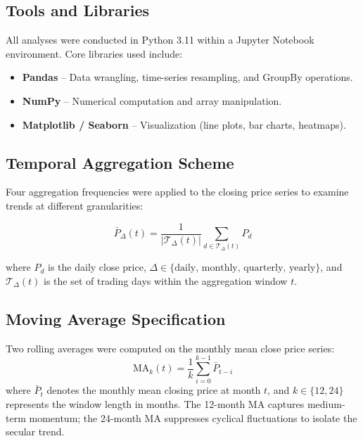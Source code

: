\documentclass[10pt,a4paper,twocolumn]{article}
\begin{document}
\subsection{Tools and Libraries}

All analyses were conducted in Python 3.11 within a Jupyter Notebook environment. Core libraries used include:
\begin{itemize}[leftmargin=1.2em, itemsep=1pt, topsep=2pt]
  \item \textbf{Pandas} -- Data wrangling, time-series resampling, and GroupBy operations.
  \item \textbf{NumPy} -- Numerical computation and array manipulation.
  \item \textbf{Matplotlib / Seaborn} -- Visualization (line plots, bar charts, heatmaps).
\end{itemize}

\subsection{Temporal Aggregation Scheme}

Four aggregation frequencies were applied to the closing price series to examine trends at different granularities:

\begin{equation}
  \bar{P}_{\Delta}(t) = \frac{1}{|\mathcal{T}_{\Delta}(t)|} \sum_{d \in \mathcal{T}_{\Delta}(t)} P_d
\end{equation}

where $P_d$ is the daily close price, $\Delta \in \{\text{daily, monthly, quarterly, yearly}\}$, and $\mathcal{T}_{\Delta}(t)$ is the set of trading days within the aggregation window $t$.

\subsection{Moving Average Specification}

Two rolling averages were computed on the monthly mean close price series:
\begin{equation}
  \text{MA}_k(t) = \frac{1}{k} \sum_{i=0}^{k-1} \bar{P}_{t-i}
\end{equation}
where $\bar{P}_t$ denotes the monthly mean closing price at month $t$, and $k \in \{12, 24\}$ represents the window length in months. The 12-month MA captures medium-term momentum; the 24-month MA suppresses cyclical fluctuations to isolate the secular trend.

\end{document}
